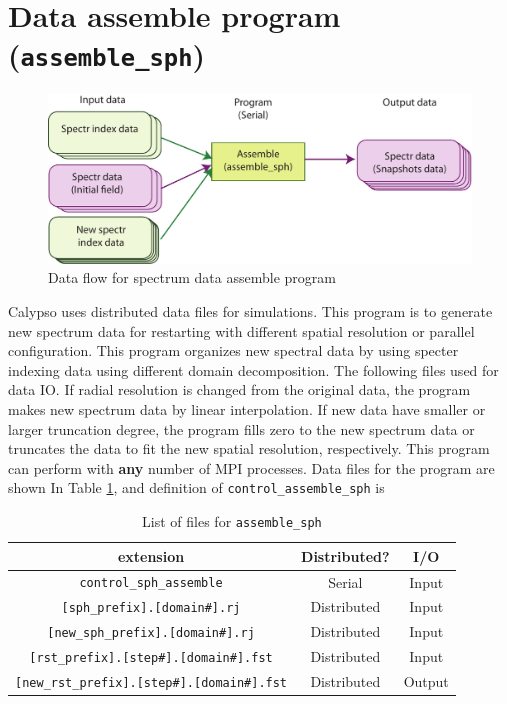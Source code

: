 \section{Data assemble program ({\tt assemble\_sph})}
\label{section:assemble_sph}
%
\begin{figure}[htbp]
\begin{center}
\includegraphics*[width=130mm]{images/flow_4}
\end{center}
\caption{Data flow for spectrum data assemble program}
\label{fig:flow_4}
\end{figure}
%
Calypso uses distributed data files for simulations. This program is to generate new spectrum data for restarting with different spatial resolution or parallel configuration. This program organizes new spectral data by using specter indexing data using different domain decomposition. The following files used for data IO. If radial resolution is changed from the original data, the program makes new spectrum data by linear interpolation. If new data have smaller or larger truncation degree, the program fills zero to the new spectrum data or truncates the data to fit the new spatial resolution, respectively. This program can perform with {\bf any} number of MPI processes. Data files for the program are shown In Table \ref{table:assemble_newsph}, and definition of \verb|control_assemble_sph| is 
%
\begin{table}[htp]
\caption{List of files for {\tt assemble\_sph} }
\begin{center} 
\begin{tabular}{|c|c|c|}
\hline
 extension & Distributed? & I/O \\ \hline
\verb|control_sph_assemble| & Serial & Input \\ \hline
\verb|[sph_prefix].[domain#].rj| &  Distributed & Input \\
\verb|[new_sph_prefix].[domain#].rj| &  Distributed & Input \\ \hline
\verb|[rst_prefix].[step#].[domain#].fst| &  Distributed & Input  \\
\verb|[new_rst_prefix].[step#].[domain#].fst| &  Distributed & Output \\ \hline
\end{tabular}
\end{center}
\label{table:assemble_newsph}
\end{table}
%

